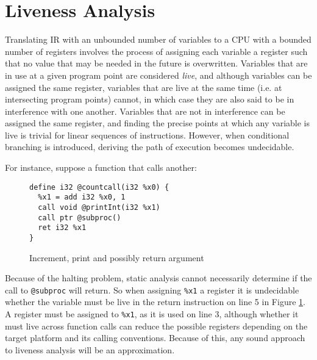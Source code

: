 \documentclass{article}
\begin{document}


\section{Liveness Analysis}

%

Translating IR with an unbounded number of variables to a CPU with a bounded number of registers involves the process of assigning each variable a register such that no value that may be needed in the future is overwritten. %
Variables that are in use at a given program point are considered \textit{live}, and although variables can be assigned the same register, %
variables that are live at the same time (i.e. at intersecting program points) cannot, in which case they are also said to be in interference with one another.
 Variables that are not in interference can be assigned the same register, and finding the precise points at which any variable is live is trivial for linear sequences of instructions. However, when conditional branching is introduced, deriving the path of execution becomes undecidable. %

For instance, suppose a function that calls another:

\begin{figure}[h]
\begin{verbatim}
define i32 @countcall(i32 %x0) {
  %x1 = add i32 %x0, 1
  call void @printInt(i32 %x1)
  call ptr @subproc()
  ret i32 %x1
}
\end{verbatim}

\caption{\label{fig:undecidable}Increment, print and possibly return argument}
\end{figure}
\noindent Because of the halting problem, static analysis cannot necessarily determine if the call to \lstinline!@subproc! will return.  %
So when assigning \lstinline!%x1! a register it is undecidable whether the variable must be live in the return instruction on line 5 in Figure \ref{fig:undecidable}.
A register must be assigned to \texttt{\%x1}, as it is used on line 3, although whether it must live across function calls can reduce the possible registers depending on the target platform and its calling conventions. %
Because of this, any sound approach to liveness analysis will be an approximation.
\end{document}
